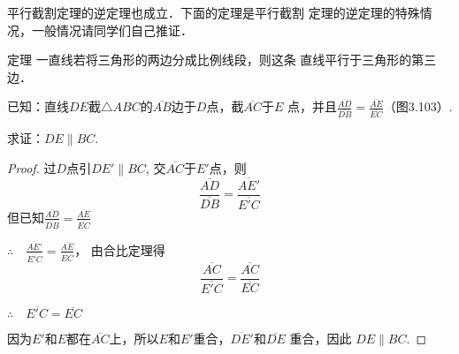 平行截割定理的逆定理也成立．下面的定理是平行截割
定理的逆定理的特殊情况，一般情况请同学们自己推证．

\begin{blk}
    {定理} 一直线若将三角形的两边分成比例线段，则这条
直线平行于三角形的第三边．
\end{blk}

\begin{example}
    已知：直线$DE$截$\triangle ABC$的$\overline{AB}$边于$D$点，截$\overline{AC}$于$E$
点，并且$\frac{\overline{AD}}{\overline{DB}}=\frac{\overline{AE}}{\overline{EC}}$（图3.103）.

求证：$DE\parallel BC$.
\end{example}


\begin{proof}
过$D$点引$DE'\parallel BC$, 交$\overline{AC}$于$E'$点，则
\[\frac{\overline{AD}}{\overline{DB}}=\frac{\overline{AE'}}{\overline{E'C}}\]
但已知$\frac{\overline{AD}}{\overline{DB}}=\frac{\overline{AE}}{\overline{EC}}$

$\therefore\quad \frac{\overline{AE'}}{\overline{E'C}}=\frac{\overline{AE}}{\overline{EC}}$，
由合比定理得
\[\frac{\overline{AC}}{\overline{E'C}}=\frac{\overline{AC}}{\overline{EC}}\]

$\therefore\quad \overline{E'C}=\overline{EC}$

因为$E'$和$E$都在$\overline{AC}$上，所以$E$和$E'$重合，$\overline{DE'}$和$\overline{DE}$
重合，因此
$DE\parallel BC$.
\end{proof}

